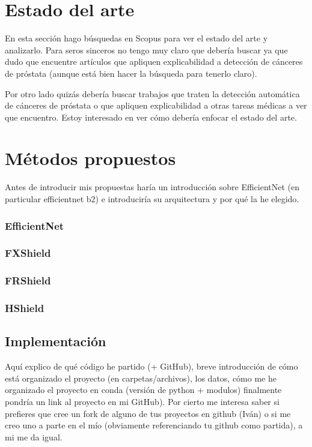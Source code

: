 \newpage
\chapter{Estado del arte} \label{cap:eda}


En esta sección hago búsquedas en Scopus para ver el estado del arte y analizarlo. Para seros sinceros no tengo muy claro que debería buscar ya que dudo que encuentre artículos que apliquen explicabilidad a detección de cánceres de próstata (aunque está bien hacer la búsqueda para tenerlo claro). 

Por otro lado quizás debería buscar trabajos que traten la detección automática de cánceres de próstata o que apliquen explicabilidad a otras tareas médicas a ver que encuentro. Estoy interesado en ver cómo debería enfocar el estado del arte.

\newpage
\chapter{Métodos propuestos} \label{cap:met}
 Antes de introducir mis propuestas haría un introducción sobre EfficientNet (en particular efficientnet b2) e introduciría su arquitectura y por qué la he elegido.

\subsection*{EfficientNet}

\clearpage
\subsection{FXShield}
\subsection{FRShield}
\subsection{HShield}

\clearpage

\section{Implementación}

Aquí explico de qué código he partido (+ GitHub), breve introducción de cómo está organizado el proyecto (en carpetas/archivos), los datos, cómo me he organizado el proyecto en conda (versión de python + modulos) finalmente pondría un link al proyecto en mi GitHub). Por cierto me interesa saber si prefieres que cree un fork de alguno de tus proyectos en github (Iván) o si me creo uno a parte en el mío (obviamente referenciando tu github como partida), a mi me da igual.



